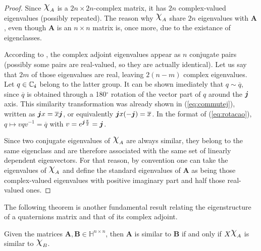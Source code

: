 \begin{proof}
    Since $\rchi_A$ is a $ 2n \times 2n $-complex matrix, it has $ 2n $ complex-valued eigenvalues (possibly repeated). The reason why $\rchi_A$ share $2n$ eigenvalues with $\mathbf{A}$, even though $\mathbf{A}$ is an $ n \times n $ matrix is, once more, due to the existance of eigenclasses.

    According to \cite[Theorem 5]{lee1948eigenvalues}, the complex adjoint eigenvalues appear as $ n $ conjugate pairs (possibly some pairs are real-valued, so they are actually identical). Let us say that $2m$ of those eigenvalues are real, leaving $2(n-m)$ complex eigenvalues. Let $ q \in \mathbb{C}_{\boldsymbol{i}}$ belong to the latter group. It can be shown imediately that $ q \sim \overline{q} $, since $ \overline{q} $ is obtained through a 180$ ^\circ $ rotation of the vector part of $ q $ around the $ \boldsymbol{j} $ axis. This similarity transformation was already shown in (\ref{eq:commutej}), written as $\boldsymbol{j} x = \overline{x} \boldsymbol{j}$, or equivalently $\boldsymbol{j} x (-\boldsymbol{j})= \overline{x}$. In the format of (\ref{eq:rotacao}), $ q \mapsto v q v^{-1} = \overline{q}$ with $ v = e^{\boldsymbol{j} \frac{\pi}{2}} = \boldsymbol{j} $.

    Since two conjugate eigenvalues of $ \rchi_A $ are always similar, they belong to the same eigenclass and are therefore associated with the same set of linearly dependent eigenvectors. For that reason, by convention one can take the eigenvalues of $ \rchi_A $ and define the standard eigenvalues of $\mathbf{A}$ as being those complex-valued eigenvalues with positive imaginary part and half those real-valued ones.
\end{proof}

The following theorem is another fundamental result relating the eigenstructure of a quaternions matrix and that of its complex adjoint.

\begin{theorem}
    \label{th:diagonal}
    Given the matrices $ \mathbf{A}, \mathbf{B} \in \mathbb{H}^{n \times n} $, then $ \mathbf{A} $ is similar to $ \mathbf{B} $ if and only if $ X\rchi_A $ is similar to $ \rchi_B $.
\end{theorem}

